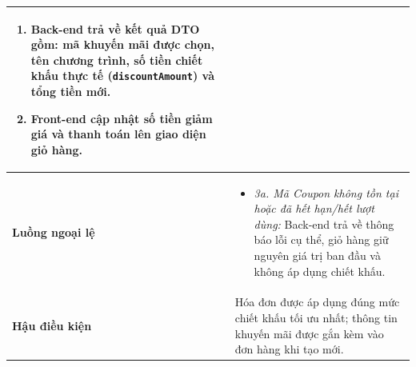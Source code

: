 \begin{table}[htbp]
\begin{tabularx}{\textwidth}{|l|X|}
\begin{enumerate}[leftmargin=*, nosep]
    \item Back-end trả về kết quả DTO gồm: mã khuyến mãi được chọn, tên chương trình, số tiền chiết khấu thực tế (\texttt{discountAmount}) và tổng tiền mới.
    \item Front-end cập nhật số tiền giảm giá và thanh toán lên giao diện giỏ hàng.
\end{enumerate} \\ \hline
\textbf{Luồng ngoại lệ} & 
\begin{itemize}[leftmargin=*, nosep]
    \item \textit{3a. Mã Coupon không tồn tại hoặc đã hết hạn/hết lượt dùng:} Back-end trả về thông báo lỗi cụ thể, giỏ hàng giữ nguyên giá trị ban đầu và không áp dụng chiết khấu.
\end{itemize} \\ \hline
\textbf{Hậu điều kiện} & Hóa đơn được áp dụng đúng mức chiết khấu tối ưu nhất; thông tin khuyến mãi được gắn kèm vào đơn hàng khi tạo mới. \\ \hline
\end{tabularx}
\end{table}

